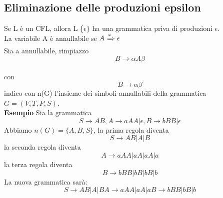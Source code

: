 \documentclass[12pt]{article}
\begin{document}
\subsection{Eliminazione delle produzioni epsilon}
Se L è un CFL, allora L \{$\epsilon\}$ ha una grammatica priva di produzioni $\epsilon$.
\\ La variabile A è annullabile se $A \xRightarrow[]{*}\epsilon$
\\ Sia a annullabile, rimpiazzo 
\[ B \rightarrow \alpha A \beta\]
\\ con
\[ B \rightarrow \alpha \beta\]
indico con n(G) l'insieme dei simboli annullabili della grammatica $G=(V,T,P,S)$.
\\ \textbf{Esempio} Sia la grammatica
\[ S \rightarrow AB, A \rightarrow aAA|\epsilon, B \rightarrow bBB|\epsilon\]
Abbiamo $n(G)=\{A,B,S\}$, la prima regola diventa 
\[ S \rightarrow AB| A |B \]
la seconda regola diventa
\[ A \rightarrow aAA| aA | aA |a \]
la terza regola diventa
\[ B \rightarrow bBB| bB | bB |b \]
La nuova grammatica sarà: 
\[ S \rightarrow AB| A |B 
A \rightarrow aAA| aA |a
B \rightarrow bBB| bB |b
\]
\end{document}
